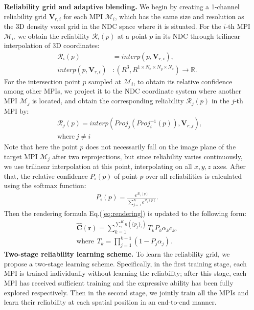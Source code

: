 \documentclass[letterpaper, 10 pt, conference]{ieeeconf}  %
\begin{document}
{\bf Reliability grid and adaptive blending.} We begin by creating a 1-channel reliability grid $\mathbf{V}_{r,i}$ for each MPI $\mathcal{M}_i$, which has the same size and resolution as the 3D density voxel grid in the NDC space where it is situated. 
For the $i$-th MPI $\mathcal{M}_i$, we obtain the reliability $\mathcal{R}_i(p)$ at a point $p$ in its NDC through trilinear interpolation of 3D coordinates:
\begin{align}
    \mathcal{R}_i(p) & =interp(p, \mathbf{V}_{r,i}), \\
interp(p, \mathbf{V}_{r,i}) & :(R^3, R^{1\times N_x\times N_y \times N_z})\to \mathbb{R}.
\end{align}
For the intersection point $p$ sampled at $\mathcal{M}_i$, to obtain its relative confidence among other MPIs, we project it to the NDC coordinate system where another MPI $\mathcal{M}_j$ is located, and obtain the corresponding reliability $\mathcal{R}_j(p) $ in the $j$-th MPI by:
\begin{align}
    & \mathcal{R}_j(p)=interp( Proj_j(Proj^{-1}_i(p)) ,\mathbf{V}_{r,j} ), \nonumber\\
    & \text{where}\ j\not= i
\end{align}
Note that here the point $p$ does not necessarily fall on the image plane of the target MPI $\mathcal{M}_j$ after two reprojections, but since reliability varies continuously, we use trilinear interpolation at this point, interpolating on all $x,y,z$ axes. After that, the relative confidence $P_i(p)$ of point $p$ over all reliabilities is calculated using the softmax function:
\begin{align}
    P_i(p) = \frac{e^{\mathcal{R}_i(p)}}{\sum_{j=1}^K e^{\mathcal{R}_j(p)} }.
\end{align}
Then the rendering formula Eq.(\ref{eq:rendering}) is updated to the following form:
\begin{align}
    \mathbf{\hat C}(\mathbf{r})=\sum_{k=1}^{\sum_l^K n(\{p_j\}_l)} T_kP_k\alpha_kc_k,\nonumber\\
    \mbox{where}\ \ T_k=\prod_{j=1}^{k-1}(1-P_j\alpha_j).
\end{align}
{\bf Two-stage reliability learning scheme.} To learn the reliability grid, we propose a two-stage learning scheme.
Specifically, in the first training stage, each MPI is trained individually without learning the reliability; after this stage, each MPI has received sufficient training and the expressive ability has been fully explored respectively.
Then in the second stage, we jointly train all the MPIs and learn their reliability at each spatial position in an end-to-end manner.
\end{document}
